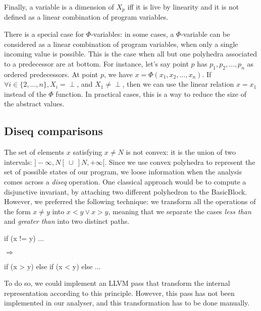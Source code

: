 \documentclass[a4paper,english,titlepage,11pt]{report}
\begin{document}
	Finally, a variable is a dimension of $X_p$ iff it is live by linearity and
	it is not defined as a linear combination of program variables.


	There is a special case for $\Phi$-variables: in some cases, a
	$\Phi$-variable can be considered as a linear combination of program
	variables, when only a single incoming value is possible. This is the case
	when all but one polyhedra associated to a predecessor are at bottom.
	For instance, let's say point $p$ has $p_1, p_2, \dots, p_n$ as ordered 
	predecessors. At point $p$, we have $x = \Phi(x_1, x_2,\dots,x_n)$.
	If $\forall i \in \{2,\dots,n\}, X_i = \perp$, and $X_1 \neq \perp$, then we
	can use the linear relation $x = x_1$ instead of the $\Phi$ function. In
	practical cases, this is a way to reduce the size of the abstract values.


\subsection{Diseq comparisons}

The set of elements $x$ satisfying $x \neq N$ is not convex: it is the union of
two intervals: $]-\infty, N[\  \cup\  ]N,+\infty[$. Since we use convex polyhedra to
represent the set of possible states of our program, we loose information when
the analysis comes across a \emph{diseq} operation.
One classical approach would be to compute a disjunctive invariant, by attaching
two different polyhedron to the BasicBlock. However, we preferred the following
technique: we transform all the operations of the form $x \neq y$ into
$x < y \vee x > y$, meaning that we separate the cases \emph{less than} and
\emph{greater than} into two distinct paths.

\begin{minipage}[c]{.29\linewidth}
\begin{C}
if (x != y) {
	...
}
\end{C}
\end{minipage} $\Rightarrow$
\begin{minipage}[c]{.69\linewidth}
\centering
\begin{C}
	if (x > y) {
	} else if (x < y) {
	} else {
		...
	}
\end{C}
\end{minipage}

To do so, we could implement an LLVM pass that transform the internal
representation according to this principle. However, this pass has not been
implemented in our analyser, and this transformation has to be done manually.
\end{document}

